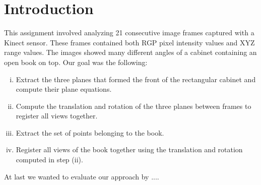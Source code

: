 \section{Introduction}
This assignment involved analyzing 21 consecutive image frames captured with a Kinect sensor. These frames contained both RGP pixel intensity values and XYZ range values. The images showed many different angles of a cabinet containing an open book on top. Our goal was the following:
\begin{enumerate}[(i)]
	\item Extract the three planes that formed the front of the rectangular cabinet and compute their plane equations.
	\item Compute the translation and rotation of the three planes between frames to register all views together.
	\item Extract the set of points belonging to the book.
	\item Register all views of the book together using the translation and rotation computed in step (ii).
\end{enumerate}
At last we wanted to evaluate our approach by ....